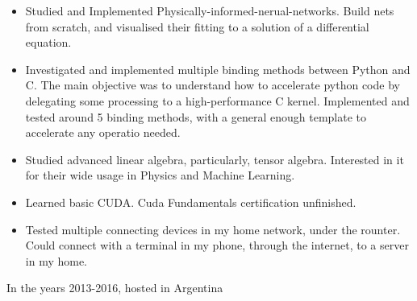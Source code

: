 \documentclass[10pt,a4paper,ragged2e,withhyper]{altacv}
\begin{document}
\begin{paracol}{2}
\begin{itemize}
    \item Studied and Implemented Physically-informed-nerual-networks. Build nets from scratch, and visualised their fitting to a solution of a differential equation.
    \item Investigated and implemented multiple binding methods between Python and C. The main objective was to understand how to accelerate python code by delegating some processing to a high-performance C kernel. Implemented and tested around 5 binding methods, with a general enough template to accelerate any operatio needed.
    \item Studied advanced linear algebra, particularly, tensor algebra. Interested in it for their wide usage in Physics and Machine Learning.
    \item Learned basic CUDA. Cuda Fundamentals certification unfinished.
    \item Tested multiple connecting devices in my home network, under the rounter. Could connect with a terminal in my phone, through the internet, to a server in my home.
\end{itemize}

\newpage




\medskip


\medskip


\medskip

{In the years 2013-2016, hosted in Argentina}

\medskip





\end{paracol}
\end{document}
